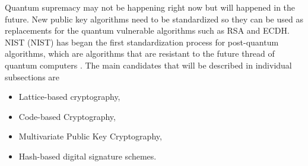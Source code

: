 Quantum supremacy may not be happening right now but will happened in the future. New public key algorithms need to be standardized so they can be used as replacements for the quantum vulnerable algorithms such as RSA and ECDH. NIST (\acl{NIST}) has began the first standardization process for post-quantum algorithms, which are algorithms that are resistant to the future thread of quantum computers \cite{Chen2016}. The main candidates that will be described in individual subsections are
\begin{itemize}
  \item Lattice-based cryptography,
  \item Code-based Cryptography,
  \item Multivariate Public Key Cryptography,
  \item Hash-based digital signature schemes\cite{Bernstein2009}.
\end{itemize}

